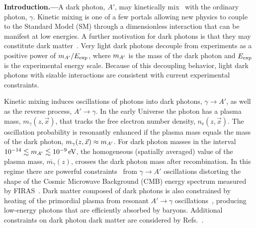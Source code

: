 \documentclass[prd,aps,10pt,nofootinbib,twocolumn,superscriptaddress,preprintnumbers,balancelastpage,longbibliography]{revtex4-1}
\begin{document}
\noindent
{\bf Introduction.---}A dark photon, $A'$, may kinetically mix~\cite{Holdom:1985ag} with the ordinary photon, $\gamma$.
Kinetic mixing is one of a few portals allowing new physics to couple to the Standard Model (SM) through a dimensionless interaction that can be manifest at low energies.  A further motivation for dark photons is that they may constitute dark matter~\cite{Redondo:2008ec,Nelson:2011sf,Arias:2012az,Fradette:2014sza,An:2014twa,Graham:2015rva,Agrawal:2018vin,Dror:2018pdh,Co:2018lka,Bastero-Gil:2018uel,Long:2019lwl}. 
Very light dark photons decouple from experiments as a positive power of $m_{A^\prime} / E_{\rm exp}$, where $m_{A^\prime}$ is the mass of the dark photon and $E_{\rm exp}$ is the experimental energy scale.  Because of this decoupling behavior, light dark photons with sizable interactions are consistent with current experimental constraints.

Kinetic mixing induces oscillations of photons into dark photons, $\gamma \rightarrow A'$, as well as the reverse process, $A' \rightarrow \gamma$.  In the early Universe the photon has a plasma mass, $m_\gamma(z, \vec x)$, that tracks the free electron number density,  $n_\mathrm{e}(z, \vec x)$.  
The oscillation probability is resonantly enhanced if the plasma mass equals the mass of the dark photon, $m_\gamma(z, \vec x) \approx m_{A^\prime}$.  For dark photon masses in the interval $10^{-14} \lesssim \mAp \lesssim \SI{e-9}{\eV}$, the homogeneous (spatially averaged) value of the plasma mass, $\overline {m_\gamma}(z)$, crosses the dark photon mass after recombination.  In this regime there are powerful constraints~\cite{Mirizzi:2009iz,Kunze:2015noa} from $\gamma \rightarrow A'$ oscillations distorting the shape of the Cosmic Microwave Background (CMB) energy spectrum measured by FIRAS~\cite{Fixsen:1996nj}.  Dark matter composed of dark photons is also constrained by heating of the primordial plasma from resonant  $A' \rightarrow \gamma$ oscillations~\cite{McDermott:2019lch}, producing low-energy photons that are efficiently absorbed by baryons.  Additional constraints on dark photon dark matter are considered by Refs.~\cite{Arias:2012az,Dubovsky:2015cca,Kovetz:2018zes,Wadekar:2019xnf}.
\end{document}

